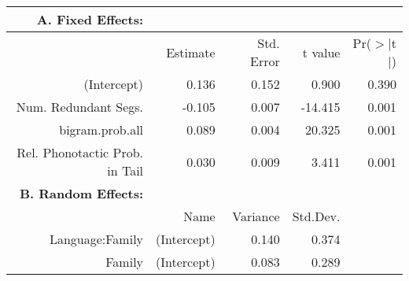\begin{tabular}{rrrrr}
 {\bf A. Fixed Effects:} \\
\hline
 & Estimate & Std. Error & t value & Pr($>$$|$t$|$) \\ 
  \hline
(Intercept) & 0.136 & 0.152 & 0.900 & 0.390 \\ 
  Num. Redundant Segs. & -0.105 & 0.007 & -14.415 & 0.001 \\ 
  bigram.prob.all & 0.089 & 0.004 & 20.325 & 0.001 \\ 
  Rel. Phonotactic Prob. in Tail & 0.030 & 0.009 & 3.411 & 0.001 \\ 

\hline \hline
{\bf B. Random Effects:} \\
\hline
& Name & Variance & Std.Dev. \\
\hline
Language:Family & (Intercept) & 0.140 & 0.374 \\
Family & (Intercept) & 0.083 & 0.289 \\
\end{tabular}
